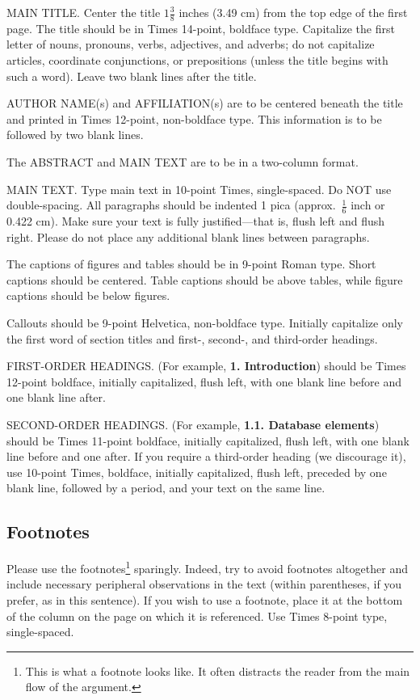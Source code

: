 \documentclass[10pt,twocolumn,letterpaper]{article}
\begin{document}
MAIN TITLE.
Center the title $1\frac{3}{8}$ inches (3.49 cm) from the top edge of the first page.
The title should be in Times 14-point, boldface type.
Capitalize the first letter of nouns, pronouns, verbs, adjectives, and adverbs;
do not capitalize articles, coordinate conjunctions, or prepositions (unless the title begins with such a word).
Leave two blank lines after the title.

AUTHOR NAME(s) and AFFILIATION(s) are to be centered beneath the title
and printed in Times 12-point, non-boldface type.
This information is to be followed by two blank lines.

The ABSTRACT and MAIN TEXT are to be in a two-column format.

MAIN TEXT.
Type main text in 10-point Times, single-spaced.
Do NOT use double-spacing.
All paragraphs should be indented 1 pica (approx.~$\frac{1}{6}$ inch or 0.422 cm).
Make sure your text is fully justified---that is, flush left and flush right.
Please do not place any additional blank lines between paragraphs.

The captions of figures and tables should be in 9-point Roman type.
Short captions should be centered.  Table captions should be above tables, while figure captions should be below figures.

\noindent Callouts should be 9-point Helvetica, non-boldface type.
Initially capitalize only the first word of section titles and first-, second-, and third-order headings.

FIRST-ORDER HEADINGS.
(For example, {\large \bf 1. Introduction}) should be Times 12-point boldface, initially capitalized, flush left, with one blank line before and one blank line after.

SECOND-ORDER HEADINGS.
(For example, { \bf 1.1. Database elements}) should be Times 11-point boldface, initially capitalized, flush left, with one blank line before and one after.
If you require a third-order heading (we discourage it), use 10-point Times, boldface, initially capitalized, flush left, preceded by one blank line, followed by a period, and your text on the same line.

\subsection{Footnotes}

Please use the footnotes\footnote{This is what a footnote looks like.
It often distracts the reader from the main flow of the argument.} sparingly.
Indeed, try to avoid footnotes altogether and include necessary peripheral observations in the text (within parentheses, if you prefer, as in this sentence).
If you wish to use a footnote, place it at the bottom of the column on the page on which it is referenced.
Use Times 8-point type, single-spaced.
\end{document}
